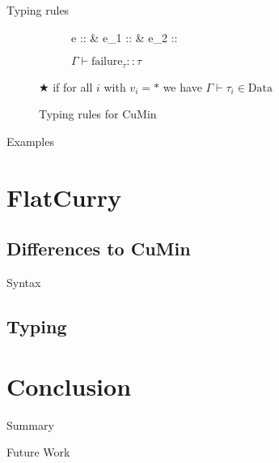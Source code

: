 \documentclass{beamer}
\begin{document}
\begin{frame}{Typing rules}
\begin{figure}[H]
\begin{scriptsize}
\begin{center}
					\begin{subfigure}[t]{.33 \linewidth}
						\centering
						{\Gamma \vdash e :: \:  & \Gamma \vdash e_{1} :: \tau & \Gamma \vdash e_{2} :: \tau}
					\end{subfigure}
					\begin{subfigure}[t]{.25 \linewidth}
						\centering
						$\Gamma \vdash \text{failure}_{\tau} :: \tau$
					\end{subfigure}
					\begin{subfigure}[t]{.33 \linewidth}
						\centering
						{\Gamma \vdash \tau \in {}}
					\end{subfigure}
				\end{center}
				\begin{flushright}
					$\bigstar$ if for all $i$ with $v_{i} = *$ we have $\Gamma \vdash \tau_{i} \in \text{Data}$
				\end{flushright}
			\end{scriptsize}
			\vspace*{-1em}
			\caption{Typing rules for CuMin}
		\end{figure}
\end{frame}
\begin{frame}{Examples}
\end{frame}
\section{FlatCurry}
\subsection{Differences to CuMin}
\begin{frame}{Syntax}
\end{frame}
\subsection{Typing}
\section{Conclusion}
\begin{frame}{Summary}
\end{frame}
\begin{frame}{Future Work}
\end{frame}
\end{document}
